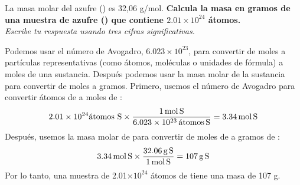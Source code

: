 La masa molar del azufre () es 32,06 g/mol.
\textbf{Calcula la masa en gramos de una muestra de azufre () que contiene $2.01 \times 10^{24}$ átomos.}\\
\emph{Escribe tu respuesta usando tres cifras significativas.}

\begin{solutionbox}{6cm}
    Podemos usar el número de Avogadro, $6.023\times 10^{23}$, para convertir de moles a partículas representativas (como átomos, moléculas o unidades de fórmula) a moles de una sustancia. Después podemos usar la masa molar de la sustancia para convertir de moles a gramos.
    Primero, usemos el número de Avogadro para convertir átomos de  a moles de :
    \[2.01\times 10^{24} \text{átomos S}\times\frac{1\,\text{mol\,S}}{6.023\times 10^{23}\,\text{átomos\,S}}=3.34\,\text{mol\,S} \]
    Después, usemos la masa molar de  para convertir de moles de  a gramos de :
    \[3.34\,\text{mol\,S}\times\frac{32.06\,\text{g\,S}}{1\,\text{mol\,S}}=107\,\text{g\,S} \]
    Por lo tanto, una muestra de 2.01$\times 10^{24}$ átomos de  tiene una masa de 107 g.
\end{solutionbox}